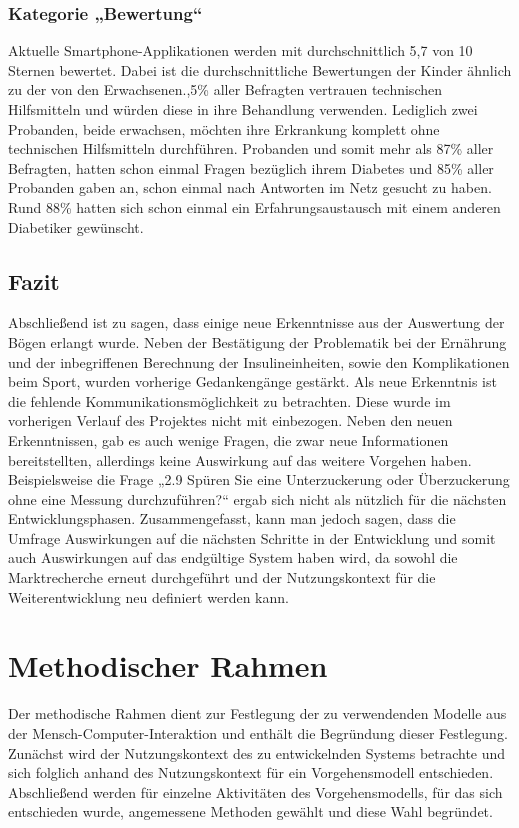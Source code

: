 \documentclass[a4paper,11pt]{article}%
\renewcommand{\\}{\vspace*{0.5\baselineskip} \newline}
\begin{document}
\subsubsection{Kategorie „Bewertung“}
	Aktuelle Smartphone-Applikationen werden mit durchschnittlich 5,7 von 10 Sternen bewertet. Dabei ist die durchschnittliche Bewertungen der Kinder ähnlich zu der von den Erwachsenen.,5\% aller Befragten vertrauen technischen Hilfsmitteln und würden diese in ihre Behandlung verwenden. Lediglich zwei Probanden, beide erwachsen, möchten ihre Erkrankung komplett ohne technischen Hilfsmitteln durchführen. Probanden und somit mehr als 87\% aller Befragten, hatten schon einmal Fragen bezüglich ihrem Diabetes und 85\% aller Probanden gaben an, schon einmal nach Antworten im Netz gesucht zu haben. Rund 88\% hatten sich schon einmal ein Erfahrungsaustausch mit einem anderen Diabetiker gewünscht.
\subsection{Fazit}
	Abschließend ist zu sagen, dass einige neue Erkenntnisse aus der Auswertung der Bögen erlangt wurde. Neben der Bestätigung der Problematik bei der Ernährung und der inbegriffenen Berechnung der Insulineinheiten, sowie den Komplikationen beim Sport, wurden vorherige Gedankengänge gestärkt. Als neue Erkenntnis ist die fehlende Kommunikationsmöglichkeit zu betrachten. Diese wurde im vorherigen Verlauf des Projektes nicht mit einbezogen. Neben den neuen Erkenntnissen, gab es auch wenige Fragen, die zwar neue Informationen bereitstellten, allerdings keine Auswirkung auf das weitere Vorgehen haben. Beispielsweise die Frage „2.9 Spüren Sie eine Unterzuckerung oder Überzuckerung ohne eine Messung durchzuführen?“ ergab sich nicht als nützlich für die nächsten Entwicklungsphasen. Zusammengefasst, kann man jedoch sagen, dass die Umfrage Auswirkungen auf die nächsten Schritte in der Entwicklung und somit auch Auswirkungen auf das endgültige System haben wird, da sowohl die Marktrecherche erneut durchgeführt und der Nutzungskontext für die Weiterentwicklung neu definiert werden kann.
\newpage
\section{Methodischer Rahmen}
\label{section:Rahmen}
	Der methodische Rahmen dient zur Festlegung der zu verwendenden Modelle aus der Mensch-Computer-Interaktion und enthält die Begründung dieser Festlegung. Zunächst wird der Nutzungskontext des zu entwickelnden Systems betrachte und sich folglich anhand des Nutzungskontext für ein Vorgehensmodell entschieden. Abschließend werden für einzelne Aktivitäten des Vorgehensmodells, für das sich entschieden wurde, angemessene Methoden gewählt und diese Wahl begründet.
\end{document}
